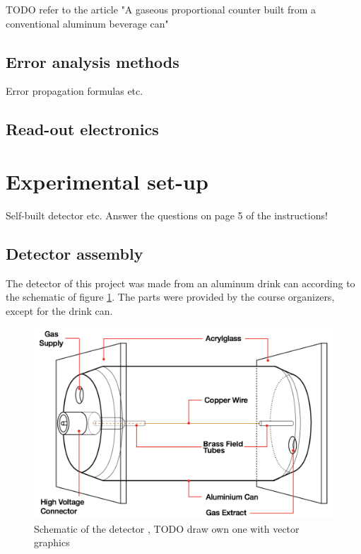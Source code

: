 \documentclass[a4paper]{article}
\begin{document}
TODO refer to the article "A gaseous proportional counter built from a conventional aluminum beverage can"

\subsection{Error analysis methods}
\label{error_analysis}
Error propagation formulas etc.

\subsection{Read-out electronics}
\label{electronics}



\section{Experimental set-up}
\label{setup}
Self-built detector etc.
Answer the questions on page 5 of the instructions!


\subsection{Detector assembly}
\label{assembly}
The detector of this project was made from an aluminum drink can according to the schematic of figure \ref{fig:schematic}.
The parts were provided by the course organizers, except for the drink can.

\begin{figure}[ht!]
\centering
\includegraphics[width=\textwidth]{fig/instructions/schematic.png}
\caption{Schematic of the detector \cite{instructions}, TODO draw own one with vector graphics}
\label{fig:schematic}
\end{figure}
\end{document}
